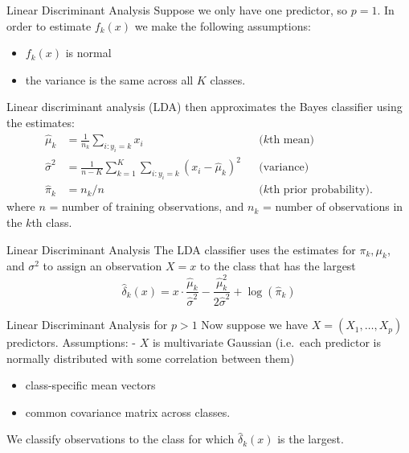 \documentclass[
  ignorenonframetext,
  aspectratio=169,
]{beamer}
\begin{document}
\begin{frame}{Linear Discriminant Analysis}
\protect\hypertarget{linear-discriminant-analysis}{}
Suppose we only have one predictor, so \(p = 1\). In order to estimate
\(f_k(x)\) we make the following assumptions:

\begin{itemize}
\item
  \(f_k(x)\) is normal
\item
  the variance is the same across all \(K\) classes.
\end{itemize}

Linear discriminant analysis (LDA) then approximates the Bayes
classifier using the estimates: \[
\begin{aligned}
\hat{\mu}_{k} &=\frac{1}{n_{k}} \sum_{i: y_{i}=k} x_{i} && (k \text{th mean)}\\
\hat{\sigma}^{2} &=\frac{1}{n-K} \sum_{k=1}^{K} \sum_{i: y_{i}=k}\left(x_{i}-\hat{\mu}_{k}\right)^{2} && \text{(variance)}\\
\hat{\pi}_{k}&=n_{k} / n && (k \text{th prior probability)}.
\end{aligned}
\] where \(n\) = number of training observations, and \(n_k\) = number
of observations in the \(k\)th class.
\end{frame}

\begin{frame}{Linear Discriminant Analysis}
\protect\hypertarget{linear-discriminant-analysis-1}{}
The LDA classifier uses the estimates for \(\pi_{k}, \mu_{k}\), and
\(\sigma^{2}\) to assign an observation \(X = x\) to the class that has
the largest \[
\hat{\delta}_{k}(x)=x \cdot \frac{\hat{\mu}_{k}}{\hat{\sigma}^{2}}-\frac{\hat{\mu}_{k}^{2}}{2 \hat{\sigma}^{2}}+\log \left(\hat{\pi}_{k}\right)
\]
\end{frame}

\begin{frame}{Linear Discriminant Analysis for \(p>1\)}
\protect\hypertarget{linear-discriminant-analysis-for-p1}{}
Now suppose we have \(X = (X_1, \dots, X_p)\) predictors. Assumptions: -
\(X\) is multivariate Gaussian (i.e.~each predictor is normally
distributed with some correlation between them)

\begin{itemize}
\item
  class-specific mean vectors
\item
  common covariance matrix across classes.
\end{itemize}

We classify observations to the class for which \(\hat{\delta}_{k}(x)\)
is the largest.
\end{frame}
\end{document}
